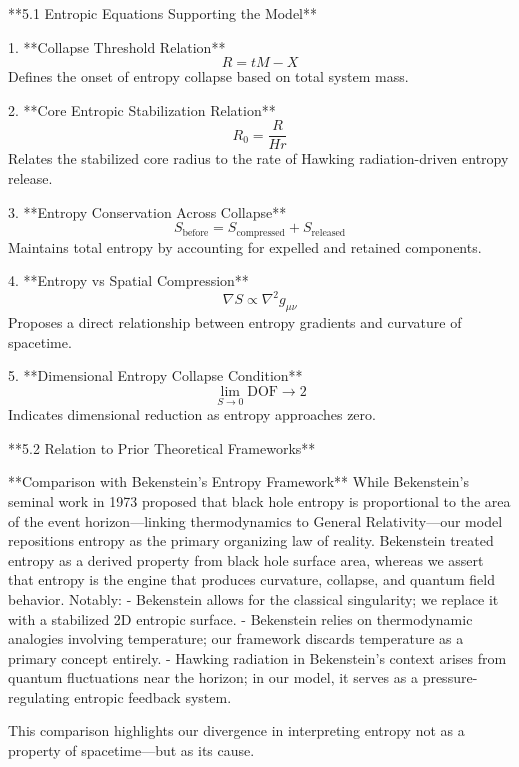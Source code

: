 **5.1 Entropic Equations Supporting the Model**

1. **Collapse Threshold Relation**  
\[ R = tM - X \]  
Defines the onset of entropy collapse based on total system mass.

2. **Core Entropic Stabilization Relation**  
\[ R_0 = \frac{R}{Hr} \]  
Relates the stabilized core radius to the rate of Hawking radiation-driven entropy release.

3. **Entropy Conservation Across Collapse**  
\[ S_{\text{before}} = S_{\text{compressed}} + S_{\text{released}} \]  
Maintains total entropy by accounting for expelled and retained components.

4. **Entropy vs Spatial Compression**  
\[ \nabla S \propto \nabla^2 g_{\mu\nu} \]  
Proposes a direct relationship between entropy gradients and curvature of spacetime.

5. **Dimensional Entropy Collapse Condition**  
\[ \lim_{S \to 0} \text{DOF} \rightarrow 2 \]  
Indicates dimensional reduction as entropy approaches zero.

**5.2 Relation to Prior Theoretical Frameworks**

**Comparison with Bekenstein’s Entropy Framework**
While Bekenstein's seminal work in 1973 proposed that black hole entropy is proportional to the area of the event horizon—linking thermodynamics to General Relativity—our model repositions entropy as the primary organizing law of reality. Bekenstein treated entropy as a derived property from black hole surface area, whereas we assert that entropy is the engine that produces curvature, collapse, and quantum field behavior. Notably:
- Bekenstein allows for the classical singularity; we replace it with a stabilized 2D entropic surface.
- Bekenstein relies on thermodynamic analogies involving temperature; our framework discards temperature as a primary concept entirely.
- Hawking radiation in Bekenstein’s context arises from quantum fluctuations near the horizon; in our model, it serves as a pressure-regulating entropic feedback system.

This comparison highlights our divergence in interpreting entropy not as a property of spacetime—but as its cause.

